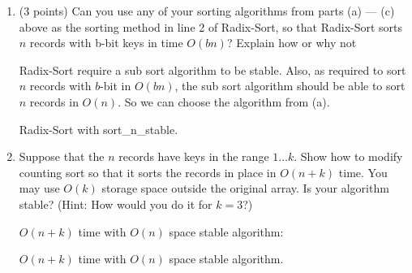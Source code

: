 \documentclass[paper=a4, fontsize=11pt]{scrartcl} %
\begin{document}
\begin{enumerate}
\item
  \begin{fancyquotes}
    (3 points) Can you use any of your sorting algorithms from parts
    (a) --- (c) above as the sorting method in line 2 of Radix-Sort,
    so that Radix-Sort sorts $n$ records with b-bit keys in time
    $O(bn)$? Explain how or why not
  \end{fancyquotes}

  Radix-Sort require a sub sort algorithm to be stable. Also, as
  required to sort $n$ records with $b$-bit in $O(bn)$, the sub sort
  algorithm should be able to sort $n$ records in $O(n)$. So we can
  choose the algorithm from (a).

  \begin{algorithm}[H]
    \caption{Radix-Sort with sort\_n\_stable.}
  \end{algorithm}

\item
  \begin{fancyquotes}
    Suppose that the $n$ records have keys in the range $1 \ldots
    k$. Show how to modify counting sort so that it sorts the records
    in place in $O(n + k)$ time. You may use $O(k)$ storage space
    outside the original array. Is your algorithm stable? (Hint: How
    would you do it for $k = 3$?)
  \end{fancyquotes}

  $O(n+k)$ time with $O(n)$ space stable algorithm:

  \begin{algorithm}[H]
    \caption{$O(n+k)$ time with $O(n)$ space stable algorithm.}
  \end{algorithm}


\end{enumerate}
\end{document}

